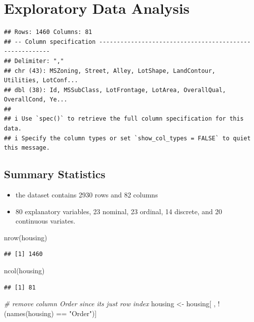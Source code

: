 \documentclass[aoas]{imsart}
\newenvironment{Shaded}{\begin{snugshade}}{\end{snugshade}}
\newcommand{\CommentTok}[1]{\textcolor[rgb]{0.56,0.35,0.01}{\textit{#1}}}
\newcommand{\FunctionTok}[1]{\textcolor[rgb]{0.00,0.00,0.00}{#1}}
\newcommand{\NormalTok}[1]{#1}
\newcommand{\OtherTok}[1]{\textcolor[rgb]{0.56,0.35,0.01}{#1}}
\newcommand{\SpecialCharTok}[1]{\textcolor[rgb]{0.00,0.00,0.00}{#1}}
\newcommand{\StringTok}[1]{\textcolor[rgb]{0.31,0.60,0.02}{#1}}
\providecommand{\tightlist}{%
  \setlength{\itemsep}{0pt}\setlength{\parskip}{0pt}}
\numberwithin{equation}{section}
\theoremstyle{plain}
\theoremstyle{remark}
\begin{document}
\hypertarget{exploratory-data-analysis}{%
\section{Exploratory Data Analysis}\label{exploratory-data-analysis}}

\begin{verbatim}
## Rows: 1460 Columns: 81
## -- Column specification --------------------------------------------------------
## Delimiter: ","
## chr (43): MSZoning, Street, Alley, LotShape, LandContour, Utilities, LotConf...
## dbl (38): Id, MSSubClass, LotFrontage, LotArea, OverallQual, OverallCond, Ye...
## 
## i Use `spec()` to retrieve the full column specification for this data.
## i Specify the column types or set `show_col_types = FALSE` to quiet this message.
\end{verbatim}

\hypertarget{summary-statistics}{%
\subsection{Summary Statistics}\label{summary-statistics}}

\begin{itemize}
\tightlist
\item
  the dataset contains 2930 rows and 82 columns
\item
  80 explanatory variables, 23 nominal, 23 ordinal, 14 discrete, and 20
  continuous variates.
\end{itemize}

\begin{Shaded}
\begin{Highlighting}[]
\FunctionTok{nrow}\NormalTok{(housing)}
\end{Highlighting}
\end{Shaded}

\begin{verbatim}
## [1] 1460
\end{verbatim}

\begin{Shaded}
\begin{Highlighting}[]
\FunctionTok{ncol}\NormalTok{(housing)}
\end{Highlighting}
\end{Shaded}

\begin{verbatim}
## [1] 81
\end{verbatim}

\begin{Shaded}
\begin{Highlighting}[]
\CommentTok{\# remove column Order since it\textquotesingle{}s just row index}
\NormalTok{housing }\OtherTok{\textless{}{-}}\NormalTok{ housing[ , }\SpecialCharTok{!}\NormalTok{(}\FunctionTok{names}\NormalTok{(housing) }\SpecialCharTok{==} \StringTok{"Order"}\NormalTok{)]}
\end{Highlighting}
\end{Shaded}
\end{document}
